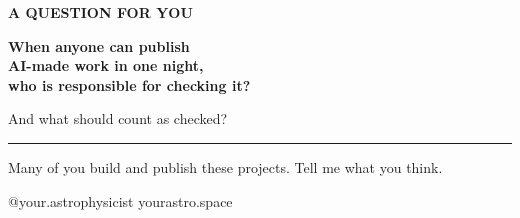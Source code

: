 \documentclass[aspectratio=169,11pt]{beamer}
\begin{document}
{
\begin{frame}[plain]
  \vspace{0.7cm}
  {\raggedright\small\color{birumuda}\bfseries A QUESTION FOR YOU\par}
  \vspace{0.3em}{\color{birumuda}\rule{2.6cm}{1.2pt}}\par
  \vspace{0.55cm}
  {\raggedright\color{white}\bfseries\fontsize{21}{29}\selectfont
  When anyone can publish\\
  AI-made work in one night,\\
  {\color{birumuda}who is responsible for checking it?}\par}
  \vspace{0.35cm}
  {\raggedright\large\color{white}And what should count as checked?\par}
  \vfill
  {\color{white!30!malam}\rule{\textwidth}{0.5pt}}\par
  \vspace{0.3cm}
  {\raggedright\color{white!85!malam}Many of you build and publish these projects. Tell me what you think.\par}
  \vspace{0.3em}
  {\raggedright\ttfamily\scriptsize\color{white!60!malam}@your.astrophysicist \textperiodcentered{} yourastro.space\par}
  \vspace{0.55cm}
\end{frame}}
\end{document}
